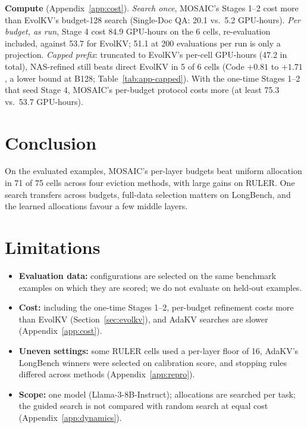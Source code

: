 \documentclass[11pt]{article}
\begin{document}
\textbf{Compute} (Appendix~\ref{app:cost}). \emph{Search once}, MOSAIC's Stages 1--2 cost more than EvolKV's budget-128 search (Single-Doc QA: 20.1 vs.\ 5.2 GPU-hours). \emph{Per budget, as run}, Stage 4 cost 84.9 GPU-hours on the 6 cells, re-evaluation included, against 53.7 for EvolKV; 51.1 at 200 evaluations per run is only a projection. \emph{Capped prefix}: truncated to EvolKV's per-cell GPU-hours (47.2 in total), NAS-refined still beats direct EvolKV in 5 of 6 cells (Code $+0.81$ to $+1.71$, a lower bound at B128; Table~\ref{tab:app-capped}). With the one-time Stages 1--2 that seed Stage 4, MOSAIC's per-budget protocol costs more (at least 75.3 vs.\ 53.7 GPU-hours).

\FloatBarrier
\section{Conclusion}

On the evaluated examples, MOSAIC's per-layer budgets beat uniform allocation in 71 of 75 cells across four eviction methods, with large gains on RULER. One search transfers across budgets, full-data selection matters on LongBench, and the learned allocations favour a few middle layers.

\section*{Limitations}

\begin{itemize}
\item \textbf{Evaluation data:} configurations are selected on the same benchmark examples on which they are scored; we do not evaluate on held-out examples.
\item \textbf{Cost:} including the one-time Stages 1--2, per-budget refinement costs more than EvolKV (Section~\ref{sec:evolkv}), and AdaKV searches are slower (Appendix~\ref{app:cost}).
\item \textbf{Uneven settings:} some RULER cells used a per-layer floor of 16, AdaKV's LongBench winners were selected on calibration score, and stopping rules differed across methods (Appendix~\ref{app:repro}).
\item \textbf{Scope:} one model (Llama-3-8B-Instruct); allocations are searched per task; the guided search is not compared with random search at equal cost (Appendix~\ref{app:dynamics}).
\end{itemize}

\FloatBarrier




\end{document}
